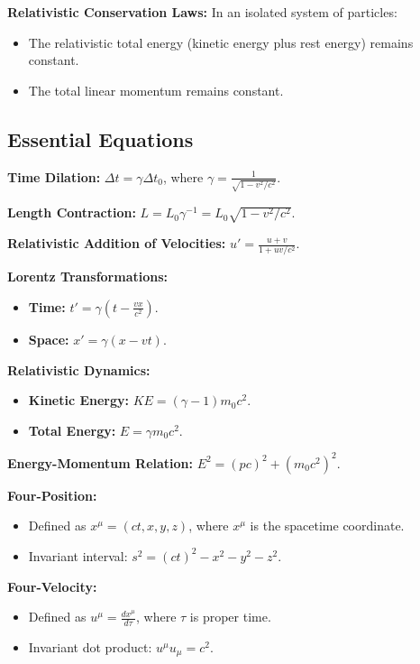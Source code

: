 \documentclass{article}
\newcommand{\eqbox}[1]{\begin{tcolorbox}[colback=gray!10] #1 \end{tcolorbox}}
\newcommand{\conceptbox}[1]{\begin{tcolorbox}[colback=blue!10] #1 \end{tcolorbox}}
\begin{document}
\conceptbox{
\textbf{Relativistic Conservation Laws:} 
In an isolated system of particles:
\begin{itemize}
    \item The relativistic total energy (kinetic energy plus rest energy) remains constant.
    \item The total linear momentum remains constant.
\end{itemize}
}

\subsection{Essential Equations}
\eqbox{
\textbf{Time Dilation:} $\Delta t = \gamma \Delta t_0$, where $\gamma = \frac{1}{\sqrt{1 - v^2/c^2}}$.
}

\eqbox{
\textbf{Length Contraction:} $L = L_0 \gamma^{-1} = L_0 \sqrt{1 - v^2/c^2}$.
}

\eqbox{
\textbf{Relativistic Addition of Velocities:} $u' = \displaystyle\frac{u + v}{1 + uv/c^2}$.
}

\eqbox{
\textbf{Lorentz Transformations:}
\begin{itemize}
    \item \textbf{Time:} $t' = \gamma(t - \frac{vx}{c^2})$.
    \item \textbf{Space:} $x' = \gamma(x - vt)$.
\end{itemize}
}

\eqbox{
\textbf{Relativistic Dynamics:}
\begin{itemize}
    \item \textbf{Kinetic Energy:} $KE = (\gamma - 1)m_0c^2$.
    \item \textbf{Total Energy:} $E = \gamma m_0c^2$.
\end{itemize}
}

\eqbox{
\textbf{Energy-Momentum Relation:} $E^2 = (pc)^2 + (m_0c^2)^2$.
}

\eqbox{
\textbf{Four-Position:}
\begin{itemize}
    \item Defined as $x^\mu = (ct, x, y, z)$, where $x^\mu$ is the spacetime coordinate.
    \item Invariant interval: $s^2 = (ct)^2 - x^2 - y^2 - z^2$.
\end{itemize}
}

\eqbox{
\textbf{Four-Velocity:}
\begin{itemize}
    \item Defined as $u^\mu = \frac{dx^\mu}{d\tau}$, where $\tau$ is proper time.
    \item Invariant dot product: $u^\mu u_\mu = c^2$.
\end{itemize}
}
\end{document}
